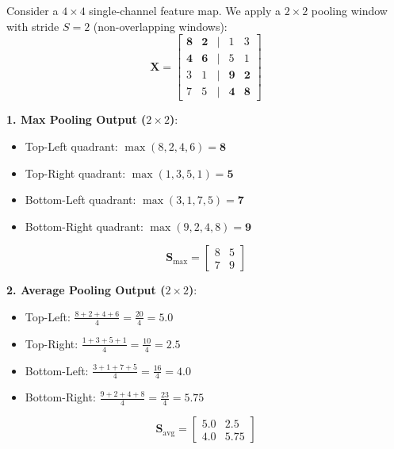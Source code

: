 \begin{example}
Consider a $4 \times 4$ single-channel feature map. We apply a $2 \times 2$ pooling window with stride $S = 2$ (non-overlapping windows):
\begin{equation*}
\mathbf{X} = \begin{bmatrix}
\mathbf{8} & \mathbf{2} & | & 1 & 3 \\
\mathbf{4} & \mathbf{6} & | & 5 & 1 \\
\hline
3 & 1 & | & \mathbf{9} & \mathbf{2} \\
7 & 5 & | & \mathbf{4} & \mathbf{8}
\end{bmatrix}
\end{equation*}

\textbf{1. Max Pooling Output ($2 \times 2$)}:
\begin{itemize}
    \item Top-Left quadrant: $\max(8, 2, 4, 6) = \mathbf{8}$
    \item Top-Right quadrant: $\max(1, 3, 5, 1) = \mathbf{5}$
    \item Bottom-Left quadrant: $\max(3, 1, 7, 5) = \mathbf{7}$
    \item Bottom-Right quadrant: $\max(9, 2, 4, 8) = \mathbf{9}$
\end{itemize}
\begin{equation*}
\mathbf{S}_{\text{max}} = \begin{bmatrix} 8 & 5 \\ 7 & 9 \end{bmatrix}
\end{equation*}

\textbf{2. Average Pooling Output ($2 \times 2$)}:
\begin{itemize}
    \item Top-Left: $\frac{8 + 2 + 4 + 6}{4} = \frac{20}{4} = \mathbf{5.0}$
    \item Top-Right: $\frac{1 + 3 + 5 + 1}{4} = \frac{10}{4} = \mathbf{2.5}$
    \item Bottom-Left: $\frac{3 + 1 + 7 + 5}{4} = \frac{16}{4} = \mathbf{4.0}$
    \item Bottom-Right: $\frac{9 + 2 + 4 + 8}{4} = \frac{23}{4} = \mathbf{5.75}$
\end{itemize}
\begin{equation*}
\mathbf{S}_{\text{avg}} = \begin{bmatrix} 5.0 & 2.5 \\ 4.0 & 5.75 \end{bmatrix}
\end{equation*}
\end{example}


